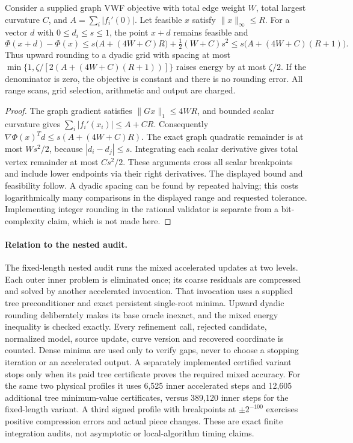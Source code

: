 \begin{lemma}
\label{lem:op3-upward-vwf-rounding}
Consider a supplied graph VWF objective with total edge weight $W$,
total largest curvature $C$, and $A=\sum_i|f_i'(0)|$. Let feasible
$x$ satisfy $\|x\|_\infty\leq R$. For a vector $d$ with
$0\leq d_i\leq s\leq1$, the point $x+d$ remains feasible and
\[
 \Phi(x+d)-\Phi(x)
 \leq s\bigl(A+(4W+C)R\bigr)+\tfrac12(W+C)s^2
 \leq s\bigl(A+(4W+C)(R+1)\bigr).
\]
Thus upward rounding to a dyadic grid with spacing at most
$\min\{1,\zeta/[2(A+(4W+C)(R+1))]\}$ raises energy by at most
$\zeta/2$. If the denominator is zero, the objective is constant and
there is no rounding error.
All range scans, grid selection, arithmetic and output are charged.
\end{lemma}
\begin{proof}
The graph gradient satisfies $\|Gx\|_1\leq4WR$, and bounded scalar
curvature gives $\sum_i|f_i'(x_i)|\leq A+CR$.
Consequently $\nabla\Phi(x)^Td\leq s(A+(4W+C)R)$.
The exact graph quadratic remainder is at most $Ws^2/2$, because
$|d_i-d_j|\leq s$. Integrating each scalar derivative gives total
vertex remainder at most $Cs^2/2$. These arguments cross all scalar
breakpoints and include lower endpoints via their right derivatives.
The displayed bound and feasibility follow. A dyadic spacing can be
found by repeated halving; this costs logarithmically many comparisons
in the displayed range and requested tolerance. Implementing integer
rounding in the rational validator is separate from a bit-complexity
claim, which is not made here.
\end{proof}

\paragraph{Relation to the nested audit.}
The fixed-length nested audit runs the mixed accelerated updates at two
levels. Each outer inner problem is eliminated once; its coarse residuals
are compressed and solved by another accelerated invocation. That
invocation uses a supplied tree preconditioner and exact persistent
single-root minima. Upward dyadic rounding deliberately makes its base
oracle inexact, and the mixed energy inequality is checked exactly.
Every refinement call, rejected candidate, normalized model, source
update, curve version and recovered coordinate is counted. Dense minima
are used only to verify gaps, never to choose a stopping iteration or
an accelerated output. A separately implemented certified variant stops
only when its paid tree certificate proves the required mixed accuracy.
For the same two physical profiles it uses 6,525 inner accelerated steps
and 12,605 additional tree minimum-value certificates, versus 389,120
inner steps for the fixed-length variant. A third signed profile with
breakpoints at $\pm2^{-100}$ exercises positive compression errors and
actual piece changes. These are exact finite integration audits, not
asymptotic or local-algorithm timing claims.
